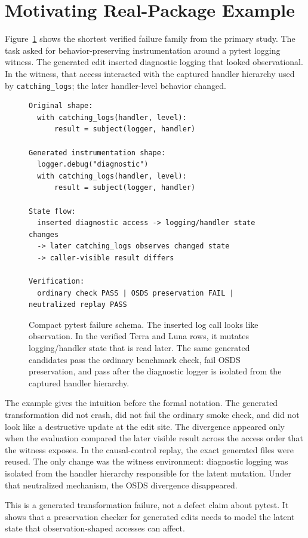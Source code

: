 \section{Motivating Real-Package Example}

Figure~\ref{fig:pytest-example} shows the shortest verified failure family from the primary study. The task asked for behavior-preserving instrumentation around a pytest logging witness. The generated edit inserted diagnostic logging that looked observational. In the witness, that access interacted with the captured handler hierarchy used by \texttt{catching\_logs}; the later handler-level behavior changed.

\begin{figure}[t]
\small
\begin{verbatim}
Original shape:
  with catching_logs(handler, level):
      result = subject(logger, handler)

Generated instrumentation shape:
  logger.debug("diagnostic")
  with catching_logs(handler, level):
      result = subject(logger, handler)

State flow:
  inserted diagnostic access -> logging/handler state changes
  -> later catching_logs observes changed state
  -> caller-visible result differs

Verification:
  ordinary check PASS | OSDS preservation FAIL | neutralized replay PASS
\end{verbatim}
\caption{Compact pytest failure schema. The inserted log call looks like observation. In the verified Terra and Luna rows, it mutates logging/handler state that is read later. The same generated candidates pass the ordinary benchmark check, fail OSDS preservation, and pass after the diagnostic logger is isolated from the captured handler hierarchy.}
\label{fig:pytest-example}
\end{figure}

The example gives the intuition before the formal notation. The generated transformation did not crash, did not fail the ordinary smoke check, and did not look like a destructive update at the edit site. The divergence appeared only when the evaluation compared the later visible result across the access order that the witness exposes. In the causal-control replay, the exact generated files were reused. The only change was the witness environment: diagnostic logging was isolated from the handler hierarchy responsible for the latent mutation. Under that neutralized mechanism, the OSDS divergence disappeared.

This is a generated transformation failure, not a defect claim about pytest. It shows that a preservation checker for generated edits needs to model the latent state that observation-shaped accesses can affect.
